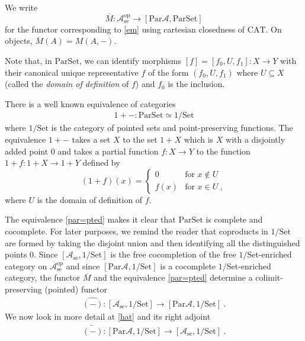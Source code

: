 \documentclass[a4paper,12pt,reqno]{amsart}
\theoremstyle{definition}
\theoremstyle{fact}
\theoremstyle{genquest}
\theoremstyle{step}
\newcommand{\lra}{\longrightarrow}
\def\CA{{\mathscr A}}
\begin{document}
We write 
$$\overline{M} : \CA_{\mathrm{se}}^{\mathrm{op}}  \lra [ \mathrm{Par}\CA,\mathrm{Par}\mathrm{Set}]$$ 
for the functor corresponding to \eqref{em} using cartesian closedness of $\mathrm{CAT}$. On objects, $\overline{M}(A) = M(A,-)$.

Note that, in $\mathrm{Par}\mathrm{Set}$, we can identify morphisms
$[f] = [f_0,U,f_1]:X\lra Y$ with their canonical unique representative $f$
of the form $(f_0,U,f_1)$ where $U\subseteq X$ 
(called the {\em domain of definition} of $f$) and $f_0$ is the inclusion.   

There is a well known equivalence of categories
\begin{eqnarray}\label{par=pted}
1+- : \mathrm{Par}\mathrm{Set} \simeq 1/\mathrm{Set}
\end{eqnarray}
where $1/\mathrm{Set}$ is the category of pointed sets 
and point-preserving functions. The equivalence $1+-$ takes a set
$X$ to the set $1+X$ which is $X$ with a disjointly added point $0$ and takes
a partial function $f : X \lra Y$ to the function $1+f : 1+X \lra 1+Y$ defined by 
\begin{equation*}
(1+f)(x) =
\begin{cases}
0 & \text{for }  x\notin U \\
f(x) & \text{for } x \in U \ ,
\end{cases}
\end{equation*}
where $U$ is the domain of definition of $f$.

The equivalence \eqref{par=pted} makes it clear that $\mathrm{Par}\mathrm{Set}$
is complete and cocomplete. 
For later purposes, we remind the reader that coproducts in $1/\mathrm{Set}$
are formed by taking the disjoint union and then identifying all the distinguished
points $0$. 
Since $[\CA_{\mathrm{se}}, 1/\mathrm{Set}]$ is the free cocompletion of the free $1/\mathrm{Set}$-enriched category on $\CA_{\mathrm{se}}^{\mathrm{op}}$ and
since $[\mathrm{Par}\CA,1/\mathrm{Set}]$ is a cocomplete $1/\mathrm{Set}$-enriched category, the functor $\overline{M}$ and the equivalence \eqref{par=pted}
determine a colimit-preserving (pointed) functor
\begin{eqnarray}\label{hat}
\widehat{(-)} : [\CA_{\mathrm{se}}, 1/\mathrm{Set}] \lra [\mathrm{Par}\CA, 1/\mathrm{Set}] \ . 
\end{eqnarray}
We now look in more detail at \eqref{hat} and its right adjoint 
\begin{eqnarray}\label{tilde}
\widetilde{(-)} : [\mathrm{Par}\CA, 1/\mathrm{Set}] \lra [\CA_{\mathrm{se}}, 1/\mathrm{Set}] \ . 
\end{eqnarray}  
\end{document}
